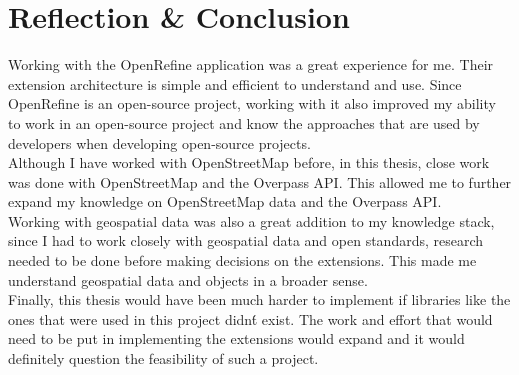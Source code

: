 \section{Reflection \& Conclusion}
Working with the OpenRefine application was a great experience for me. Their extension architecture is simple and efficient to understand and use.
Since OpenRefine is an open-source project, working with it also improved my ability to work in an open-source project
and know the approaches that are used by developers when developing open-source projects.\\
\newline
Although I have worked with OpenStreetMap before, in this thesis, close work was done with OpenStreetMap and the Overpass API. This allowed me to further
expand my knowledge on OpenStreetMap data and the Overpass API.\\
\newline
Working with geospatial data was also a great addition to my knowledge stack, since I had to work closely with geospatial data and open standards,
research needed to be done before making decisions on the extensions. This made me understand geospatial data and objects in a broader sense.\\
\newline
Finally, this thesis would have been much harder to implement if libraries like the ones that were used in this project didn\'t exist. The work and effort
that would need to be put in implementing the extensions would expand and it would definitely question the feasibility of such a project.